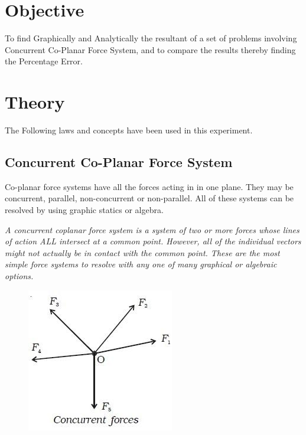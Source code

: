 \documentclass[11pt]{article}
\begin{document}
	
\tableofcontents
\thispagestyle{empty}
\clearpage


\setcounter{page}{1}

\section{Objective}
To find Graphically and Analytically the resultant of a set of problems involving Concurrent Co-Planar Force System, and to compare the results thereby finding the Percentage Error.

\section{Theory}
The Following laws and concepts have been used in this experiment.

\subsection{Concurrent Co-Planar Force System}

Co-planar force systems have all the forces acting in in one plane. They may be concurrent, parallel, non-concurrent or non-parallel. All of these systems can be resolved by using graphic statics or algebra.

\textit{A concurrent coplanar force system is a system of two or more forces whose lines of action ALL intersect at a common point. However, all of the individual vectors might not actually be in contact with the common point. These are the most simple force systems to resolve with any one of many graphical or algebraic options.}\\

\begin{figure}[H]
	\centering
	\includegraphics[scale=0.5]{concurrent coplanar force system.jpg}
	\label{fig:CCFS}
\end{figure}
\end{document}
